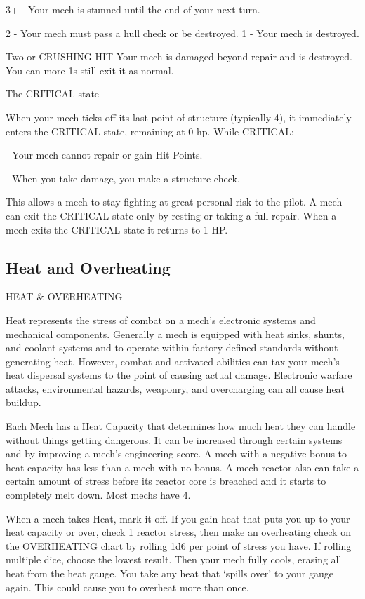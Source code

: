                                           3+ - Your mech is stunned until the end of your next turn.

                                          2 - Your mech must pass a hull check or be destroyed.
                                          1 - Your mech is destroyed.

 Two or          CRUSHING HIT             Your mech is damaged beyond repair and is destroyed. You can
 more 1s                                  still exit it as normal.

                                              The CRITICAL state


When your mech ticks off its last point of structure (typically 4), it immediately enters the
CRITICAL state, remaining at 0 hp. While CRITICAL:

             -    Your mech cannot repair or gain Hit Points.

             -    When you take damage, you make a structure check.

This allows a mech to stay fighting at great personal risk to the pilot. A mech can exit the
CRITICAL state only by resting or taking a full repair. When a mech exits the CRITICAL state it
returns to 1 HP.

\subsection{Heat and Overheating}

  HEAT \& OVERHEATING

Heat represents the stress of combat on a mech’s electronic systems and mechanical
components. Generally a mech is equipped with heat sinks, shunts, and coolant systems and to
operate within factory defined standards without generating heat. However, combat and
activated abilities can tax your mech’s heat dispersal systems to the point of causing actual
damage. Electronic warfare attacks, environmental hazards, weaponry, and overcharging can all
cause heat buildup.


Each Mech has a Heat Capacity that determines how much heat they can handle without things
getting dangerous. It can be increased through certain systems and by improving a mech’s
engineering score. A mech with a negative bonus to heat capacity has less than a mech with no
bonus. A mech reactor also can take a certain amount of stress before its reactor core is
breached and it starts to completely melt down. Most mechs have 4.


When a mech takes Heat, mark it off. If you gain heat that puts you up to your heat capacity or
over, check 1 reactor stress, then make an overheating check on the OVERHEATING chart by
rolling 1d6 per point of stress you have. If rolling multiple dice, choose the lowest result. Then
your mech fully cools, erasing all heat from the heat gauge. You take any heat that ‘spills over’ to
your gauge again. This could cause you to overheat more than once.


